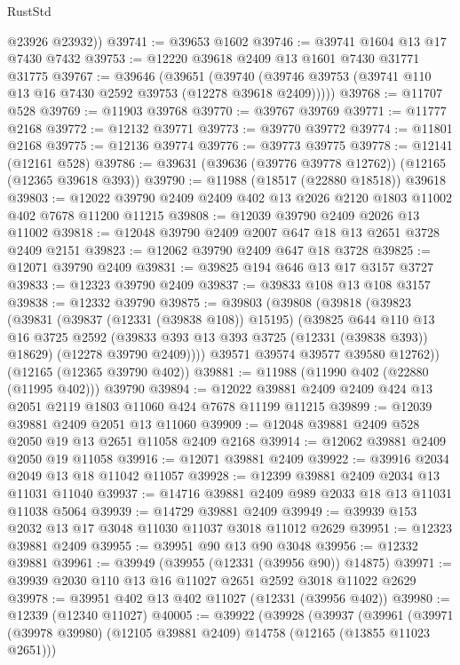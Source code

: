 \begin{lexlean}{RustStd}
\begin{coremodule}
        @23926
        @23932))
@39741 := @39653 @1602
@39746 := @39741 @1604 @13 @17 @7430 @7432
@39753 := @12220 @39618 @2409 @13 @1601 @7430 @31771 @31775
@39767 := @39646
    (@39651 (@39740 (@39746 @39753 (@39741 @110 @13 @16 @7430 @2592 @39753 (@12278 @39618 @2409)))))
@39768 := @11707 @528
@39769 := @11903 @39768
@39770 := @39767 @39769
@39771 := @11777 @2168
@39772 := @12132 @39771
@39773 := @39770 @39772
@39774 := @11801 @2168
@39775 := @12136 @39774
@39776 := @39773 @39775
@39778 := @12141 (@12161 @528)
@39786 := @39631 (@39636 (@39776 @39778 @12762)) (@12165 (@12365 @39618 @393))
@39790 := @11988 (@18517 (@22880 @18518)) @39618
@39803 := @12022 @39790 @2409 @2409 @402 @13 @2026 @2120 @1803 @11002 @402 @7678 @11200 @11215
@39808 := @12039 @39790 @2409 @2026 @13 @11002
@39818 := @12048 @39790 @2409 @2007 @647 @18 @13 @2651 @3728 @2409 @2151
@39823 := @12062 @39790 @2409 @647 @18 @3728
@39825 := @12071 @39790 @2409
@39831 := @39825 @194 @646 @13 @17 @3157 @3727
@39833 := @12323 @39790 @2409
@39837 := @39833 @108 @13 @108 @3157
@39838 := @12332 @39790
@39875 := @39803
    (@39808
      (@39818
        (@39823
          (@39831
            (@39837 (@12331 (@39838 @108)) @15195)
            (@39825
              @644
              @110
              @13
              @16
              @3725
              @2592
              (@39833 @393 @13 @393 @3725 (@12331 (@39838 @393)) @18629)
              (@12278 @39790 @2409))))
        @39571
        @39574
        @39577
        @39580
        @12762))
    (@12165 (@12365 @39790 @402))
@39881 := @11988 (@11990 @402 (@22880 (@11995 @402))) @39790
@39894 := @12022 @39881 @2409 @2409 @424 @13 @2051 @2119 @1803 @11060 @424 @7678 @11199 @11215
@39899 := @12039 @39881 @2409 @2051 @13 @11060
@39909 := @12048 @39881 @2409 @528 @2050 @19 @13 @2651 @11058 @2409 @2168
@39914 := @12062 @39881 @2409 @2050 @19 @11058
@39916 := @12071 @39881 @2409
@39922 := @39916 @2034 @2049 @13 @18 @11042 @11057
@39928 := @12399 @39881 @2409 @2034 @13 @11031 @11040
@39937 := @14716 @39881 @2409 @989 @2033 @18 @13 @11031 @11038 @5064
@39939 := @14729 @39881 @2409
@39949 := @39939 @153 @2032 @13 @17 @3048 @11030 @11037 @3018 @11012 @2629
@39951 := @12323 @39881 @2409
@39955 := @39951 @90 @13 @90 @3048
@39956 := @12332 @39881
@39961 := @39949 (@39955 (@12331 (@39956 @90)) @14875)
@39971 := @39939 @2030 @110 @13 @16 @11027 @2651 @2592 @3018 @11022 @2629
@39978 := @39951 @402 @13 @402 @11027 (@12331 (@39956 @402))
@39980 := @12339 (@12340 @11027)
@40005 := @39922
    (@39928
      (@39937
        (@39961
          (@39971 (@39978 @39980) (@12105 @39881 @2409) @14758 (@12165 (@13855 @11023 @2651)))

\end{coremodule}
\end{lexlean}
